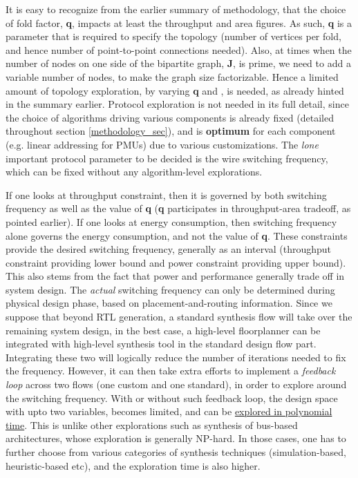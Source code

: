 \documentclass[12pt]{article}
\begin{document}
It is easy to recognize from the earlier summary of methodology, that the
choice of fold factor, \textbf{q}, impacts at least the throughput and area
figures. As such, \textbf{q} is a parameter that is required to specify the
topology (number of vertices per fold, and hence number of point-to-point
connections needed). Also, at times when the number of nodes on one side of
the bipartite graph, \textbf{J}, is prime, we need to add a variable number
of nodes,  to make the graph size factorizable. Hence a
limited amount of topology exploration, by varying \textbf{q} and
, is needed, as already hinted in the summary earlier.
Protocol exploration is not needed in its full detail,
since the choice of algorithms driving various components is already
fixed (detailed throughout section \ref{methodology_sec}), and is
\textbf{optimum} for each component (e.g. linear addressing for PMUs) due to various customizations. The
\textit{lone} important protocol parameter to be decided is the wire
switching frequency, which can be fixed without any algorithm-level
explorations.

If one looks at throughput constraint, then it is governed by
both switching frequency as well as the value of \textbf{q} (\textbf{q}
participates in throughput-area tradeoff, as pointed earlier). If one looks
at energy consumption, then switching frequency alone governs the energy
consumption, and not the value of \textbf{q}. These constraints provide the
desired switching frequency, generally as an interval (throughput constraint
providing lower bound and power constraint providing upper bound). This
also stems from the fact that power and performance generally trade off in
system design. The \textit{actual} switching frequency can only be determined during physical
design phase, based on placement-and-routing information. Since we suppose
that beyond RTL generation, a standard synthesis flow will take over the
remaining system design, in the best case, a high-level floorplanner
\cite{fp_bus_syn} can be integrated with high-level synthesis tool in the
standard design flow part. Integrating these two will logically reduce the
number of iterations needed to fix the frequency. However, it can then take
extra efforts to implement a \textit{feedback loop} across two flows (one
custom and one standard), in order to
explore around the switching frequency. With or without such feedback loop,
the design space with upto two variables, becomes
limited, and can be \uline{explored in polynomial time}. This is unlike other
explorations such as synthesis of bus-based architectures, whose
exploration is generally NP-hard. In those cases, one has to further choose from
various categories of synthesis techniques (simulation-based,
heuristic-based etc), and the exploration time is also higher.
\end{document}
